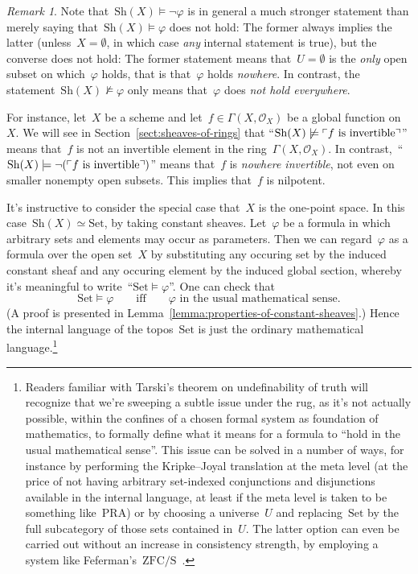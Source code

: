 \documentclass[10pt,reqno,a4paper]{amsbook}
\theoremstyle{definition}
\theoremstyle{plain}
\theoremstyle{remark}
\newtheorem{rem}[defn]{Remark}
\renewcommand{\O}{\mathcal{O}}
\newcommand{\Set}{\mathrm{Set}}
\newcommand{\Sh}{\mathrm{Sh}}
\newcommand{\?}{\,{:}\,}
\renewcommand{\_}{\mathpunct{.}\,}
\newcommand{\speak}[1]{\ulcorner\text{\textnormal{#1}}\urcorner}
\begin{document}
\begin{rem}Note that~$\Sh(X) \models \neg\varphi$ is in general a much stronger
statement than merely saying that~$\Sh(X) \models \varphi$ does not hold:
The former always implies the latter (unless~$X = \emptyset$, in which case
\emph{any} internal statement is true), but the converse does not hold: The
former statement means that~$U = \emptyset$ is the \emph{only} open subset on
which~$\varphi$ holds, that is that~$\varphi$ holds \emph{nowhere}. In
contrast, the statement~$\Sh(X) \not\models \varphi$ only means that~$\varphi$
does \emph{not hold everywhere}.

For instance, let~$X$ be a scheme and let~$f \in
\Gamma(X,\O_X)$ be a global function on~$X$. We will see in
Section~\ref{sect:sheaves-of-rings} that ``$\Sh(X) \not\models \speak{$f$ is
invertible}$'' means that~$f$ is not an invertible element in the
ring~$\Gamma(X,\O_X)$. In contrast,~``$\Sh(X) \models \neg(\speak{$f$ is
invertible})$'' means that~$f$ is \emph{nowhere invertible}, not even on
smaller non\-empty open subsets. This implies that~$f$ is nilpotent.
\end{rem}

It's instructive to consider the special case that~$X$ is the one-point space.
In this case~$\Sh(X) \simeq \Set$, by taking constant sheaves.
Let~$\varphi$ be a formula in which arbitrary sets and elements may occur as
parameters. Then we can regard~$\varphi$ as a formula over the open set~$X$ by
substituting any occuring set by the induced constant sheaf and any occuring
element by the induced global section, whereby it's meaningful to
write~``$\Set \models \varphi$''. One can check that
\[ \Set \models \varphi \qquad\text{iff}\qquad \text{$\varphi$ in the usual
mathematical sense}. \]
(A proof is presented in Lemma~\ref{lemma:properties-of-constant-sheaves}.)
Hence the internal language of the topos~$\Set$ is just the ordinary
mathematical language.\footnote{Readers familiar with Tarski's theorem on
undefinability of truth will recognize that we're sweeping a subtle issue under
the rug, as it's not actually possible, within the confines of a chosen formal
system as foundation of mathematics, to formally define what it means for a
formula to ``hold in the usual mathematical sense''. This issue can be solved
in a number of ways, for instance by performing the Kripke--Joyal translation
at the meta level (at the price of not having arbitrary set-indexed
conjunctions and disjunctions available in the internal language, at least if
the meta level is taken to be something like~$\mathrm{PRA}$) or by choosing a
universe~$U$ and replacing~$\Set$ by the full subcategory of those sets
contained in~$U$. The latter option can even be carried out without an increase
in consistency strength, by employing a system
like Feferman's~$\mathrm{ZFC}/\mathrm{S}$~\cite{shulman:set-theory,feferman:set-foundations}.}
\end{document}

